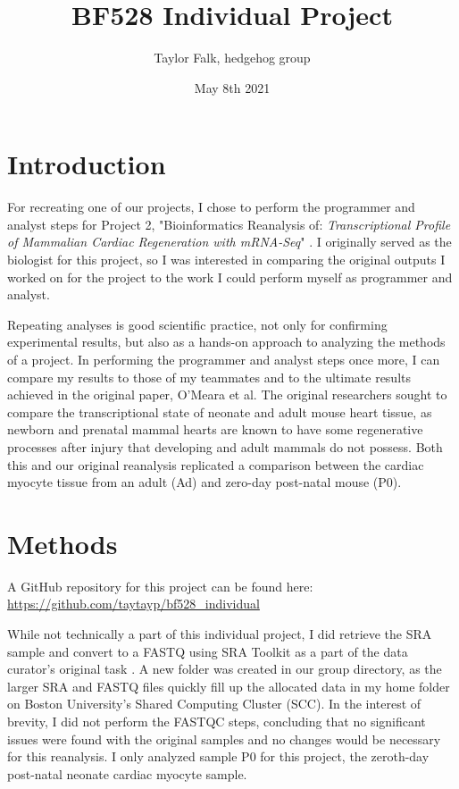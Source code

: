 \documentclass{article}
\title{BF528 Individual Project}
\author{Taylor Falk, hedgehog group}
\date{May 8th 2021}
\begin{document}
\maketitle
\section{Introduction}
For recreating one of our projects, I chose to perform the programmer and analyst steps for Project 2, "Bioinformatics Reanalysis of: \textit{Transcriptional Profile of Mammalian Cardiac Regeneration with mRNA-Seq}" \cite{omearaTranscriptionalReversionCardiac2015}. I originally served as the biologist for this project, so I was interested in comparing the original outputs I worked on for the project to the work I could perform myself as programmer and analyst.

Repeating analyses is good scientific practice, not only for confirming experimental results, but also as a hands-on approach to analyzing the methods of a project. In performing the programmer and analyst steps once more, I can compare my results to those of my teammates and to the ultimate results achieved in the original paper, O'Meara et al. The original researchers sought to compare the transcriptional state of neonate and adult mouse heart tissue, as newborn and prenatal mammal hearts are known to have some regenerative processes after injury that developing and adult mammals do not possess. Both this and our original reanalysis replicated a comparison between the cardiac myocyte tissue from an adult (Ad) and zero-day post-natal mouse (P0).

\section{Methods}
A GitHub repository for this project can be found here: \url{https://github.com/taytayp/bf528_individual}

While not technically a part of this individual project, I did retrieve the SRA sample and convert to a FASTQ using SRA Toolkit as a part of the data curator's original task \cite{DownloadSoftwareSequence}. A new folder was created in our group directory, as the larger SRA and FASTQ files quickly fill up the allocated data in my home folder on Boston University's Shared Computing Cluster (SCC). In the interest of brevity, I did not perform the FASTQC steps, concluding that no significant issues were found with the original samples and no changes would be necessary for this reanalysis. I only analyzed sample P0 for this project, the zeroth-day post-natal neonate cardiac myocyte sample.
\end{document}
